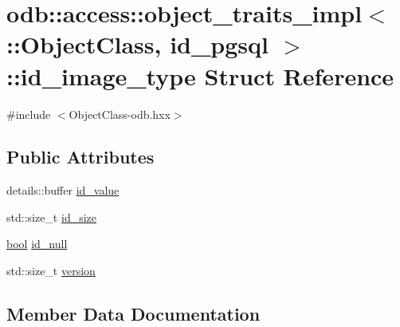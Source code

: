 \hypertarget{structodb_1_1access_1_1object__traits__impl_3_01_1_1_object_class_00_01id__pgsql_01_4_1_1id__image__type}{}\section{odb\+:\+:access\+:\+:object\+\_\+traits\+\_\+impl$<$ \+:\+:Object\+Class, id\+\_\+pgsql $>$\+:\+:id\+\_\+image\+\_\+type Struct Reference}
\label{structodb_1_1access_1_1object__traits__impl_3_01_1_1_object_class_00_01id__pgsql_01_4_1_1id__image__type}


{\ttfamily \#include $<$Object\+Class-\/odb.\+hxx$>$}

\subsection*{Public Attributes}
\begin{DoxyCompactItemize}
\item 
details\+::buffer \hyperlink{structodb_1_1access_1_1object__traits__impl_3_01_1_1_object_class_00_01id__pgsql_01_4_1_1id__image__type_a1014e43a9bb0d398885baefca406c617}{id\+\_\+value}
\item 
std\+::size\+\_\+t \hyperlink{structodb_1_1access_1_1object__traits__impl_3_01_1_1_object_class_00_01id__pgsql_01_4_1_1id__image__type_a8069053611faa17dbd247b3e53b20d80}{id\+\_\+size}
\item 
\hyperlink{classodb_1_1access_1_1object__traits_3_01_1_1_object_class_01_4_a1f9680cb812834a08dfbf195bd41a057}{bool} \hyperlink{structodb_1_1access_1_1object__traits__impl_3_01_1_1_object_class_00_01id__pgsql_01_4_1_1id__image__type_ae9413169f48bdd0e776e0da9f93f8286}{id\+\_\+null}
\item 
std\+::size\+\_\+t \hyperlink{structodb_1_1access_1_1object__traits__impl_3_01_1_1_object_class_00_01id__pgsql_01_4_1_1id__image__type_ab6758ede2ed23642f74eff59658f5eeb}{version}
\end{DoxyCompactItemize}


\subsection{Member Data Documentation}
\hypertarget{structodb_1_1access_1_1object__traits__impl_3_01_1_1_object_class_00_01id__pgsql_01_4_1_1id__image__type_ae9413169f48bdd0e776e0da9f93f8286}{}
